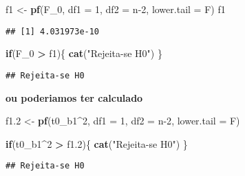 \documentclass[
]{article}
\newenvironment{Shaded}{\begin{snugshade}}{\end{snugshade}}
\newcommand{\ControlFlowTok}[1]{\textcolor[rgb]{0.13,0.29,0.53}{\textbf{#1}}}
\newcommand{\DataTypeTok}[1]{\textcolor[rgb]{0.13,0.29,0.53}{#1}}
\newcommand{\DecValTok}[1]{\textcolor[rgb]{0.00,0.00,0.81}{#1}}
\newcommand{\FloatTok}[1]{\textcolor[rgb]{0.00,0.00,0.81}{#1}}
\newcommand{\KeywordTok}[1]{\textcolor[rgb]{0.13,0.29,0.53}{\textbf{#1}}}
\newcommand{\NormalTok}[1]{#1}
\newcommand{\OperatorTok}[1]{\textcolor[rgb]{0.81,0.36,0.00}{\textbf{#1}}}
\newcommand{\StringTok}[1]{\textcolor[rgb]{0.31,0.60,0.02}{#1}}
\begin{document}
\begin{Shaded}
\begin{Highlighting}[]
\NormalTok{f1 <-}\StringTok{ }\KeywordTok{pf}\NormalTok{(F_}\DecValTok{0}\NormalTok{, }\DataTypeTok{df1 =} \DecValTok{1}\NormalTok{, }\DataTypeTok{df2 =}\NormalTok{ n}\DecValTok{-2}\NormalTok{, }\DataTypeTok{lower.tail =}\NormalTok{ F)}
\NormalTok{f1}
\end{Highlighting}
\end{Shaded}

\begin{verbatim}
## [1] 4.031973e-10
\end{verbatim}

\begin{Shaded}
\begin{Highlighting}[]
\ControlFlowTok{if}\NormalTok{(F_}\DecValTok{0} \OperatorTok{>}\StringTok{ }\NormalTok{f1)\{}
  \KeywordTok{cat}\NormalTok{(}\StringTok{"Rejeita-se H0"}\NormalTok{)}
\NormalTok{\}}
\end{Highlighting}
\end{Shaded}

\begin{verbatim}
## Rejeita-se H0
\end{verbatim}

\textbf{ou poderiamos ter calculado}

\begin{Shaded}
\begin{Highlighting}[]
\NormalTok{f1}\FloatTok{.2}\NormalTok{ <-}\StringTok{ }\KeywordTok{pf}\NormalTok{(t0_b1}\OperatorTok{^}\DecValTok{2}\NormalTok{, }\DataTypeTok{df1 =} \DecValTok{1}\NormalTok{, }\DataTypeTok{df2 =}\NormalTok{ n}\DecValTok{-2}\NormalTok{, }\DataTypeTok{lower.tail =}\NormalTok{ F)}
\end{Highlighting}
\end{Shaded}

\begin{Shaded}
\begin{Highlighting}[]
\ControlFlowTok{if}\NormalTok{(t0_b1}\OperatorTok{^}\DecValTok{2} \OperatorTok{>}\StringTok{ }\NormalTok{f1}\FloatTok{.2}\NormalTok{)\{}
  \KeywordTok{cat}\NormalTok{(}\StringTok{"Rejeita-se H0"}\NormalTok{)}
\NormalTok{\}}
\end{Highlighting}
\end{Shaded}

\begin{verbatim}
## Rejeita-se H0
\end{verbatim}
\end{document}
